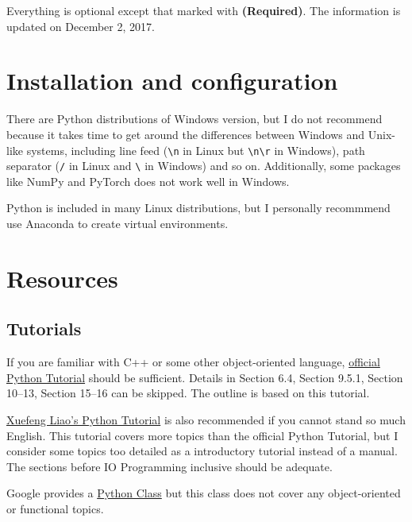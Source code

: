 \documentclass[english]{pkupaper}
\title{\titlemark}
\author{pppppass}
\date{\today}
\begin{document}
	\maketitle

Everything is optional except that marked with \textbf{(Required)}. The information is updated on December 2, 2017.

\section{Installation and configuration}

There are Python distributions of Windows version, but I do not recommend because it takes time to get around the differences between Windows and Unix-like systems, including line feed (\verb"\n" in Linux but \verb"\n\r" in Windows), path separator (\verb"/" in Linux and \verb"\" in Windows) and so on. Additionally, some packages like NumPy and PyTorch does not work well in Windows.

Python is included in many Linux distributions, but I personally recommmend  use Anaconda to create virtual environments.

\section{Resources}

\subsection{Tutorials}

If you are familiar with C++ or some other object-oriented language, \href{https://docs.python.org/3.6/tutorial/index.html}{official Python Tutorial} should be sufficient. Details in Section 6.4, Section 9.5.1, Section 10--13, Section 15--16 can be skipped. The outline is based on this tutorial.

\href{https://www.liaoxuefeng.com/wiki/0014316089557264a6b348958f449949df42a6d3a2e542c000}{Xuefeng Liao's Python Tutorial} is also recommended if you cannot stand so much English. This tutorial covers more topics than the official Python Tutorial, but I consider some topics too detailed as a introductory tutorial instead of a manual.
The sections before IO Programming inclusive should be adequate.

Google provides a \href{https://developers.google.com/edu/python/}{Python Class} but this class does not cover any object-oriented or functional topics.
\end{document}
